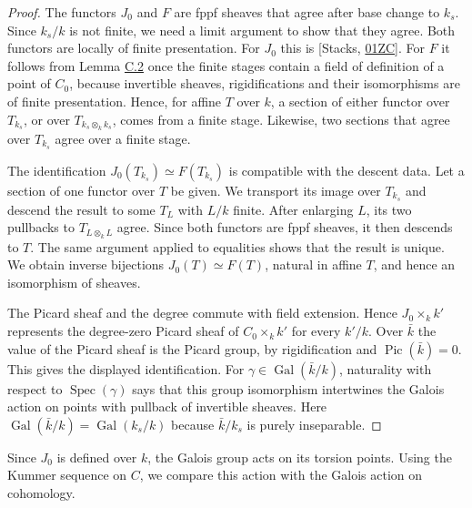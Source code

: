 \documentclass[11pt]{article}
\begin{document}
\begin{proof}[{Proof}]
The functors \(J_0\) and \(F\) are fppf sheaves that agree after base change to \(k_s\). Since \(k_s/k\) is not finite, we need a limit argument to show that they agree. Both functors are locally of finite presentation. For \(J_0\) this is [Stacks, \href{https://stacks.math.columbia.edu/tag/01ZC}{01ZC}]. For \(F\) it follows from Lemma \hyperref[bp125]{C.2} once the finite stages contain a field of definition of a point of \(C_0\), because invertible sheaves, rigidifications and their isomorphisms are of finite presentation. Hence, for affine \(T\) over \(k\), a section of either functor over \(T_{k_s}\), or over \(T_{k_s\otimes_kk_s}\), comes from a finite stage. Likewise, two sections that agree over \(T_{k_s}\) agree over a finite stage.

The identification \(J_0(T_{k_s})\simeq F(T_{k_s})\) is compatible with the descent data. Let a section of one functor over \(T\) be given. We transport its image over \(T_{k_s}\) and descend the result to some \(T_L\) with \(L/k\) finite. After enlarging \(L\), its two pullbacks to \(T_{L\otimes_kL}\) agree. Since both functors are fppf sheaves, it then descends to \(T\). The same argument applied to equalities shows that the result is unique. We obtain inverse bijections \(J_0(T)\simeq F(T)\), natural in affine \(T\), and hence an isomorphism of sheaves.

The Picard sheaf and the degree commute with field extension. Hence \(J_0\times_kk'\) represents the degree-zero Picard sheaf of \(C_0\times_kk'\) for every \(k'/k\). Over \(\bar k\) the value of the Picard sheaf is the Picard group, by rigidification and \(\operatorname{Pic}(\bar k)=0\). This gives the displayed identification. For \(\gamma\in\operatorname{Gal}(\bar k/k)\), naturality with respect to \(\operatorname{Spec}(\gamma)\) says that this group isomorphism intertwines the Galois action on points with pullback of invertible sheaves. Here \(\operatorname{Gal}(\bar k/k)=\operatorname{Gal}(k_s/k)\) because \(\bar k/k_s\) is purely inseparable.
\end{proof}

\label{bp169}%
Since \(J_0\) is defined over \(k\), the Galois group acts on its torsion points. Using the Kummer sequence on \(C\), we compare this action with the Galois action on cohomology.
\end{document}
